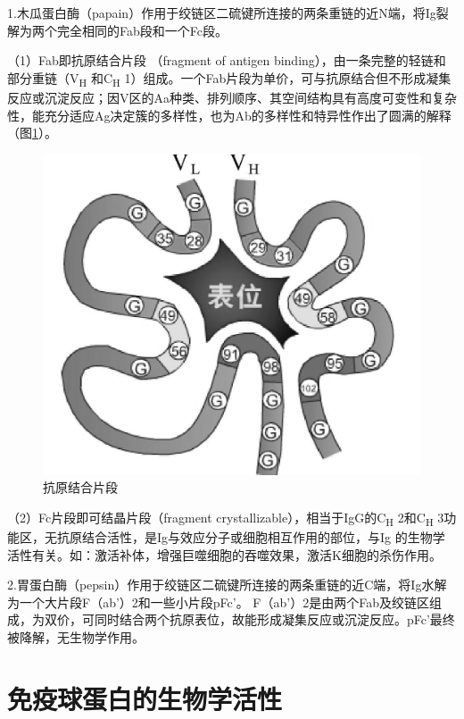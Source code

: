 1.木瓜蛋白酶（papain）作用于绞链区二硫键所连接的两条重链的近N端，将Ig裂解为两个完全相同的Fab段和一个Fc段。

（1）Fab即抗原结合片段 （fragment of antigen
binding），由一条完整的轻链和部分重链（V\textsubscript{H}
和C\textsubscript{H}
1）组成。一个Fab片段为单价，可与抗原结合但不形成凝集反应或沉淀反应；因V区的Aa种类、排列顺序、其空间结构具有高度可变性和复杂性，能充分适应Ag决定簇的多样性，也为Ab的多样性和特异性作出了圆满的解释（图\ref{fig4-5}）。

\begin{figure}[!htbp]
 \centering
 \includegraphics{./images/Image00065.jpg}
 \captionsetup{justification=centering}
 \caption{抗原结合片段}
 \label{fig4-5}
  \end{figure} 

（2）Fc片段即可结晶片段（fragment
crystallizable），相当于IgG的C\textsubscript{H} 2和C\textsubscript{H}
3功能区，无抗原结合活性，是Ig与效应分子或细胞相互作用的部位，与Ig
的生物学活性有关。如：激活补体，增强巨噬细胞的吞噬效果，激活K细胞的杀伤作用。

2.胃蛋白酶（pepsin）作用于绞链区二硫键所连接的两条重链的近C端，将Ig水解为一个大片段F（ab'）2和一些小片段pFc'。
F（ab'）2是由两个Fab及绞链区组成，为双价，可同时结合两个抗原表位，故能形成凝集反应或沉淀反应。pFc'最终被降解，无生物学作用。

\section{免疫球蛋白的生物学活性}


